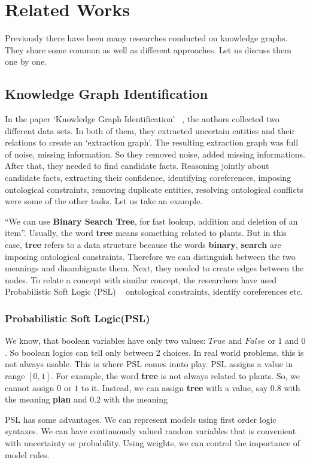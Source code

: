 \chapter{Related Works}\label{ch2}
Previously there have been many researches conducted on knowledge graphs. They share some common as well 
as different approaches.
Let us discuss them one by one.
 \section{Knowledge Graph Identification}
In the paper `Knowledge Graph Identification' ~\cite{ref0kgi}, the authors collected two different data sets.
In both of them, they extracted uncertain entities and their relations to create an `extraction graph'. 
The resulting extraction graph was full of noise, missing information. So they removed noise, 
added missing informations. After that, they needed to find candidate facts. 
Reasoning jointly about candidate facts, extracting their confidence, identifying coreferences, 
 imposing ontological constraints, removing duplicate entities, resolving ontological conflicts
 were some of the other tasks. Let us take an example.

 ``We can use \textbf{Binary Search Tree}, for fast lookup, addition and deletion of an item''.
Usually, the word \textbf{tree} means something related to plants. But in this case, \textbf{tree}
refers to a data structure because the words \textbf{binary}, \textbf{search} are imposing ontological 
constraints. Therefore we can distinguish between the two meanings and disambiguate them. Next, they needed to 
create edges between the nodes.
 To relate a concept with similar concept,
the researchers have used Probabilistic Soft Logic (PSL) ~\cite{ref0psl}  ontological constraints,
identify coreferences etc. 
\subsection{Probabilistic Soft Logic(PSL)}
We know, that boolean variables have only two values: $True$ and $False$ or $1$ and $0$. So boolean
logics can tell only between 2 choices. In real world problems, this is not always usable. 
This is where PSL comes innto play. PSL assigns a value in range $[0,1]$. For example, the word
 \textbf{tree} is not always related to plants. So, we cannot assign $0$ or $1$ to it.
  Instead, we can assign \textbf{tree} with a value, say $0.8$ with the meaning \textbf{plan}
  and $0.2$ with the meaning  

PSL has some advantages. We can represent models using first order logic syntaxes.
We can have continuously valued random variables that is convenient with uncertainty or probability.
Using weights, we can control the importance of model rules.

